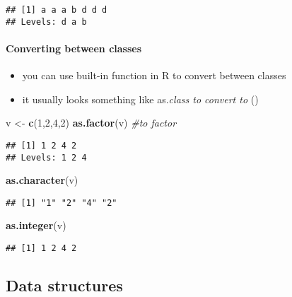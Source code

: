 \documentclass[]{article}
\newenvironment{Shaded}{\begin{snugshade}}{\end{snugshade}}
\newcommand{\KeywordTok}[1]{\textcolor[rgb]{0.13,0.29,0.53}{\textbf{{#1}}}}
\newcommand{\DecValTok}[1]{\textcolor[rgb]{0.00,0.00,0.81}{{#1}}}
\newcommand{\StringTok}[1]{\textcolor[rgb]{0.31,0.60,0.02}{{#1}}}
\newcommand{\CommentTok}[1]{\textcolor[rgb]{0.56,0.35,0.01}{\textit{{#1}}}}
\newcommand{\NormalTok}[1]{{#1}}
\providecommand{\tightlist}{%
  \setlength{\itemsep}{0pt}\setlength{\parskip}{0pt}}
\let\oldparagraph\paragraph
\renewcommand{\paragraph}[1]{\oldparagraph{#1}\mbox{}}
\begin{document}
\begin{verbatim}
## [1] a a a b d d d
## Levels: d a b
\end{verbatim}

\paragraph{Converting between classes}\label{converting-between-classes}

\begin{itemize}
\tightlist
\item
  you can use built-in function in R to convert between classes
\item
  it usually looks something like as.\emph{class to convert to} ()
\end{itemize}

\begin{Shaded}
\begin{Highlighting}[]
\NormalTok{v <-}\StringTok{ }\KeywordTok{c}\NormalTok{(}\DecValTok{1}\NormalTok{,}\DecValTok{2}\NormalTok{,}\DecValTok{4}\NormalTok{,}\DecValTok{2}\NormalTok{)}
\KeywordTok{as.factor}\NormalTok{(v) }\CommentTok{#to factor}
\end{Highlighting}
\end{Shaded}

\begin{verbatim}
## [1] 1 2 4 2
## Levels: 1 2 4
\end{verbatim}

\begin{Shaded}
\begin{Highlighting}[]
\KeywordTok{as.character}\NormalTok{(v)}
\end{Highlighting}
\end{Shaded}

\begin{verbatim}
## [1] "1" "2" "4" "2"
\end{verbatim}

\begin{Shaded}
\begin{Highlighting}[]
\KeywordTok{as.integer}\NormalTok{(v)}
\end{Highlighting}
\end{Shaded}

\begin{verbatim}
## [1] 1 2 4 2
\end{verbatim}

\subsection{Data structures}\label{data-structures}
\end{document}

